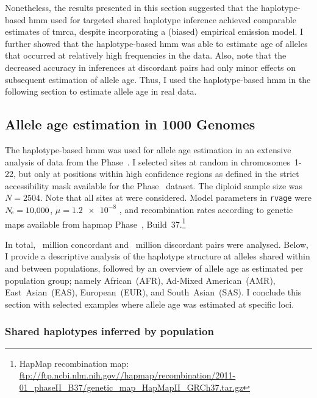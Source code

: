 Nonetheless, the results presented in this section suggested that the haplotype-based \gls{hmm} used for targeted shared haplotype inference achieved comparable estimates of \gls{tmrca}, despite incorporating a (biased) empirical emission model.
I further showed that the haplotype-based \gls{hmm} was able to estimate age of alleles that occurred at relatively high frequencies in the data.
Also, note that the decreased accuracy in inferences at discordant pairs had only minor effects on subsequent estimation of allele age.
Thus, I used the haplotype-based \gls{hmm} in the following section to estimate allele age in real data.





%
\subsection{Allele age estimation in 1000 Genomes}\label{sec:hhmm_1kg}
%

The haplotype-based \gls{hmm} was used for allele age estimation in an extensive analysis of data from the  Phase~.
I selected  sites at random in chromosomes~1-22, but only at positions within high confidence regions as defined in the strict accessibility mask available for the Phase~ dataset.
The diploid sample size was ${N=\num{2504}}$.
Note that all sites at  were considered.
Model parameters in \texttt{rvage} were ${\Ne=\n{10000}}$, ${\mu=\num[round-precision=1]{1.2e-8}}$ , and recombination rates according to genetic maps available from \gls{hapmap} Phase~, Build~37.\footnote{HapMap recombination map: \url{ftp://ftp.ncbi.nlm.nih.gov//hapmap/recombination/2011-01_phaseII_B37/genetic_map_HapMapII_GRCh37.tar.gz} }

In total, ~million concordant and ~million discordant pairs were analysed.
Below, I provide a descriptive analysis of the haplotype structure at alleles shared within and between populations, followed by an overview of allele age as estimated per population group; namely African~(AFR), Ad-Mixed American~(AMR), East~Asian~(EAS), European~(EUR), and South~Asian~(SAS).
I conclude this section with selected examples where allele age was estimated at specific loci.


%
\subsubsection{Shared haplotypes inferred by population}
%

